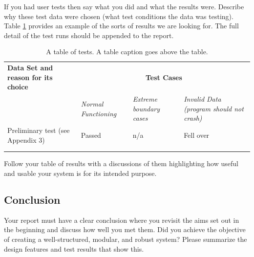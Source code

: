\documentclass[11pt,a4paper]{article}
\begin{document}
If you had user tests then say what you did and what the results
were. Describe why these test data were chosen (what test conditions
the data was testing).  Table \ref{tab:tests} provides an example of
the sorts of results we are looking for. The full detail of the test
runs should be appended to the report.

\begin{table}[h!]
  \centering
\caption{A table of tests. A table caption goes above the table.}

  \begin{tabular}[t]{|p{5.5cm}|p{3cm}|p{3cm}|p{3cm}|} \hline \textbf{Data Set
    and reason for its choice} & \multicolumn{3}{c|}{\textbf{Test Cases}}\\
    \cline{2-4} & \emph{Normal Functioning} & \emph{Extreme boundary cases} &
    \emph{Invalid Data (program should not crash)} \\ \hline Preliminary test
    (see Appendix 3) & Passed & n/a & Fell over \\\hline &&&\\ \hline
    &&&\\ \hline
  \end{tabular}

\label{tab:tests}
\end{table}

Follow your table of results with a discussions of them highlighting
how useful and usable your system is for its intended purpose.

\subsection{Conclusion}
\label{ss:conclusion}

Your report must have a clear conclusion where you revisit the aims
set out in the beginning and discuss how well you met them. Did you
achieve the objective of creating a well-structured, modular, and
robust system?  Please summarize the design features and test results
that show this.
\end{document}
